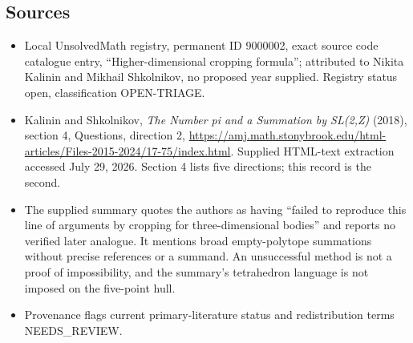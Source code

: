 \documentclass[11pt]{article}
\begin{document}
\subsection{Sources}
\begin{itemize}
\item Local UnsolvedMath registry, permanent ID 9000002, exact source code catalogue entry, ``Higher-dimensional cropping formula''; attributed to Nikita Kalinin and Mikhail Shkolnikov, no proposed year supplied. Registry status open, classification OPEN-TRIAGE.
\item Kalinin and Shkolnikov, \emph{The Number pi and a Summation by SL(2,Z)} (2018), section 4, Questions, direction 2, \url{https://amj.math.stonybrook.edu/html-articles/Files-2015-2024/17-75/index.html}. Supplied HTML-text extraction accessed July 29, 2026. Section 4 lists five directions; this record is the second.
\item The supplied summary quotes the authors as having ``failed to reproduce this line of arguments by cropping for three-dimensional bodies'' and reports no verified later analogue. It mentions broad empty-polytope summations without precise references or a summand. An unsuccessful method is not a proof of impossibility, and the summary's tetrahedron language is not imposed on the five-point hull.
\item Provenance flags current primary-literature status and redistribution terms NEEDS\_REVIEW.
\end{itemize}
\end{document}

